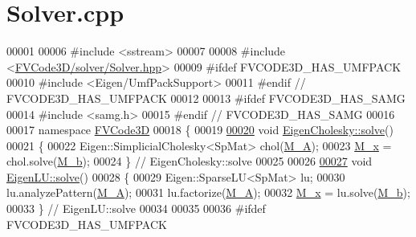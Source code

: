 \hypertarget{Solver_8cpp_source}{}\section{Solver.\+cpp}
\label{Solver_8cpp_source}

\begin{DoxyCode}
00001 
00006 \textcolor{preprocessor}{#include <sstream>}
00007 
00008 \textcolor{preprocessor}{#include <\hyperlink{Solver_8hpp}{FVCode3D/solver/Solver.hpp}>}
00009 \textcolor{preprocessor}{#ifdef FVCODE3D\_HAS\_UMFPACK}
00010 \textcolor{preprocessor}{#include <Eigen/UmfPackSupport>}
00011 \textcolor{preprocessor}{#endif // FVCODE3D\_HAS\_UMFPACK}
00012 
00013 \textcolor{preprocessor}{#ifdef FVCODE3D\_HAS\_SAMG}
00014 \textcolor{preprocessor}{#include <samg.h>}
00015 \textcolor{preprocessor}{#endif // FVCODE3D\_HAS\_SAMG}
00016 
00017 \textcolor{keyword}{namespace }\hyperlink{namespaceFVCode3D}{FVCode3D}
00018 \{
00019 
\hypertarget{Solver_8cpp_source.tex_l00020}{}\hyperlink{classFVCode3D_1_1EigenCholesky_a596379f4aba4ebbdd4c19d08d187580d}{00020} \textcolor{keywordtype}{void} \hyperlink{classFVCode3D_1_1EigenCholesky_a596379f4aba4ebbdd4c19d08d187580d}{EigenCholesky::solve}()
00021 \{
00022     Eigen::SimplicialCholesky<SpMat> chol(\hyperlink{classFVCode3D_1_1Solver_a7a7d556033c96bef473a2dc694af9036}{M\_A});
00023     \hyperlink{classFVCode3D_1_1Solver_a6414eabf461e95a8fc5b8a49bb06e8cb}{M\_x} = chol.solve(\hyperlink{classFVCode3D_1_1Solver_ac1203c2ea481f5ebd0ce061c1e8073d3}{M\_b});
00024 \} \textcolor{comment}{// EigenCholesky::solve}
00025 
00026 
\hypertarget{Solver_8cpp_source.tex_l00027}{}\hyperlink{classFVCode3D_1_1EigenLU_a8ba5cd2307cbf7309fe77cd0b60edb60}{00027} \textcolor{keywordtype}{void} \hyperlink{classFVCode3D_1_1EigenLU_a8ba5cd2307cbf7309fe77cd0b60edb60}{EigenLU::solve}()
00028 \{
00029     Eigen::SparseLU<SpMat> lu;
00030     lu.analyzePattern(\hyperlink{classFVCode3D_1_1Solver_a7a7d556033c96bef473a2dc694af9036}{M\_A});
00031     lu.factorize(\hyperlink{classFVCode3D_1_1Solver_a7a7d556033c96bef473a2dc694af9036}{M\_A});
00032     \hyperlink{classFVCode3D_1_1Solver_a6414eabf461e95a8fc5b8a49bb06e8cb}{M\_x} = lu.solve(\hyperlink{classFVCode3D_1_1Solver_ac1203c2ea481f5ebd0ce061c1e8073d3}{M\_b});
00033 \} \textcolor{comment}{// EigenLU::solve}
00034 
00035 
00036 \textcolor{preprocessor}{#ifdef FVCODE3D\_HAS\_UMFPACK}

\end{DoxyCode}
